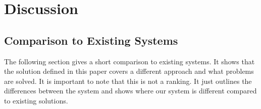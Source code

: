 \documentclass[runningheads]{llncs}
\begin{document}
%



\section{Discussion}

\subsection{Comparison to Existing Systems}
The following section gives a short comparison to existing systems. It shows that the solution defined in this paper covers a different approach and what problems are solved. It is important to note that this is not a ranking. It just outlines the differences between the system and shows where our system is different compared to existing solutions.
\end{document}
